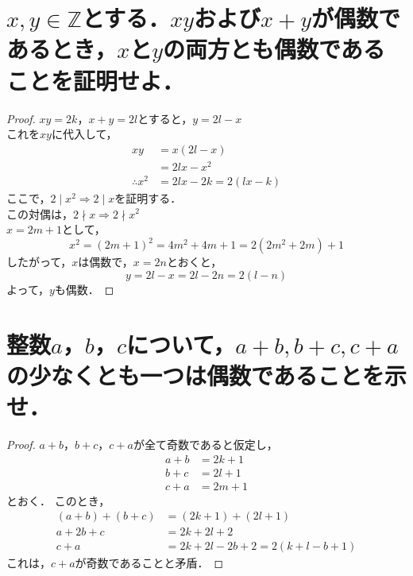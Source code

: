 \documentclass[a4paper,12pt]{ltjsarticle}
\newcommand{\Z}{\mathbb{Z}}
\begin{document}
\section{$x,y \in \Z$とする．$xy$および$x + y$が偶数であるとき，$x$と$y$の両方とも偶数であることを証明せよ．}
\begin{proof}
    $xy = 2k$，$x + y = 2l$とすると，$y = 2l - x$ \\
    これを$xy$に代入して，
    \begin{align*}
        xy &= x(2l - x) \\
           &= 2lx - x^2 \\
        \therefore x^2 &= 2lx - 2k = 2(lx - k)
    \end{align*}
    ここで，$2 \mid x^2 \Rightarrow 2 \mid x$を証明する．\\
    この対偶は，$2 \nmid x \Rightarrow 2 \nmid x^2$ \\
    $x = 2m + 1$として，
    \begin{equation*}
        x^2 = (2m + 1)^2 = 4m^2 + 4m + 1 = 2(2m^2 + 2m) + 1
    \end{equation*}
    したがって，$x$は偶数で，$x = 2n$とおくと，
    \begin{equation*}
        y = 2l - x = 2l - 2n = 2(l - n)
    \end{equation*}
    よって，$y$も偶数．
\end{proof}

\section{整数$a$，$b$，$c$について，$a + b, b + c, c + a$の少なくとも一つは偶数であることを示せ．}
\begin{proof}
    $a + b$，$b + c$，$c + a$が全て奇数であると仮定し，
    \begin{align*}
        a + b &= 2k + 1 \\
        b + c &= 2l + 1 \\
        c + a &= 2m + 1
    \end{align*}
    とおく．
    このとき，
    \begin{align*}
        (a + b) + (b + c) &= (2k + 1) + (2l + 1) \\
        a + 2b + c &= 2k + 2l + 2 \\
        c + a &= 2k + 2l - 2b + 2 = 2(k + l - b + 1)
    \end{align*}
    これは，$c + a$が奇数であることと矛盾．
\end{proof}
\end{document}
